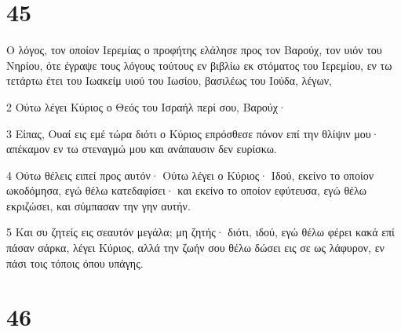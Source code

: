 \chapter{45}

\par Ο λόγος, τον οποίον Ιερεμίας ο προφήτης ελάλησε προς τον Βαρούχ, τον υιόν του Νηρίου, ότε έγραψε τους λόγους τούτους εν βιβλίω εκ στόματος του Ιερεμίου, εν τω τετάρτω έτει του Ιωακείμ υιού του Ιωσίου, βασιλέως του Ιούδα, λέγων,
\par 2 Ούτω λέγει Κύριος ο Θεός του Ισραήλ περί σου, Βαρούχ·
\par 3 Είπας, Ουαί εις εμέ τώρα διότι ο Κύριος επρόσθεσε πόνον επί την θλίψιν μου· απέκαμον εν τω στεναγμώ μου και ανάπαυσιν δεν ευρίσκω.
\par 4 Ούτω θέλεις ειπεί προς αυτόν· Ούτω λέγει ο Κύριος· Ιδού, εκείνο το οποίον ωκοδόμησα, εγώ θέλω κατεδαφίσει· και εκείνο το οποίον εφύτευσα, εγώ θέλω εκριζώσει, και σύμπασαν την γην αυτήν.
\par 5 Και συ ζητείς εις σεαυτόν μεγάλα; μη ζητής· διότι, ιδού, εγώ θέλω φέρει κακά επί πάσαν σάρκα, λέγει Κύριος, αλλά την ζωήν σου θέλω δώσει εις σε ως λάφυρον, εν πάσι τοις τόποις όπου υπάγης.

\chapter{46}

